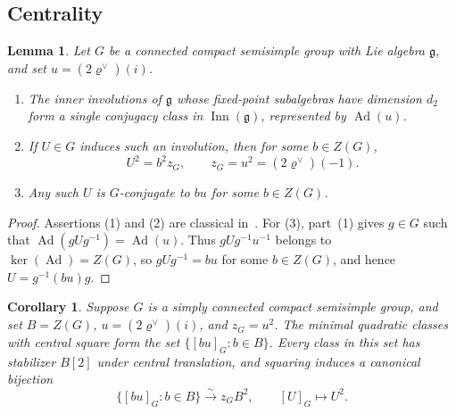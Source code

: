 \documentclass[11pt,a4paper,reqno]{amsart}
\theoremstyle{plain}
\newtheorem{lemma}[theorem]{Lemma}
\newtheorem{corollary}[theorem]{Corollary}
\theoremstyle{definition}
\theoremstyle{remark}
\numberwithin{equation}{section}
\DeclareMathOperator{\Ad}{Ad}
\newcommand{\fg}{\mathfrak g}
\newcommand{\rh}{\varrho^\vee}
\begin{document}
\subsection{Centrality}

\begin{lemma}\label{lem:involution}
Let $G$ be a connected compact semisimple group with Lie algebra $\fg$, and set $u=(2\rh)(i)$.
\begin{enumerate}[label=\textup{(\arabic*)},leftmargin=2em]
\item The inner involutions of $\fg$ whose fixed-point subalgebras have dimension $d_2$ form a single conjugacy class in $\operatorname{Inn}(\fg)$, represented by $\Ad(u)$.
\item If $U\in G$ induces such an involution, then for some $b\in Z(G)$,
\[
U^2=b^2z_G,\qquad z_G=u^2=(2\rh)(-1).
\]
\item Any such $U$ is $G$-conjugate to $bu$ for some $b\in Z(G)$.
\end{enumerate}
\end{lemma}

\begin{proof}
Assertions \textup{(1)} and \textup{(2)} are classical in~\cite[\S3.2]{SLinv}. For \textup{(3)}, part~\textup{(1)} gives $g\in G$ such that $\Ad(gUg^{-1})=\Ad(u)$. Thus $gUg^{-1}u^{-1}$ belongs to $\ker(\Ad)=Z(G)$, so $gUg^{-1}=bu$ for some $b\in Z(G)$, and hence $U=g^{-1}(bu)g$.
\end{proof}

\begin{corollary}\label{cor:squares}
Suppose $G$ is a simply connected compact semisimple group, and set $B=Z(G)$, $u=(2\rh)(i)$, and $z_G=u^2$. The minimal quadratic classes with central square form the set $\{[bu]_G:b\in B\}$. Every class in this set has stabilizer $B[2]$ under central translation, and squaring induces a canonical bijection
\[
\{[bu]_G:b\in B\}\xrightarrow{\sim}z_GB^2,
\qquad [U]_G\longmapsto U^2.
\]
\end{corollary}
\end{document}
